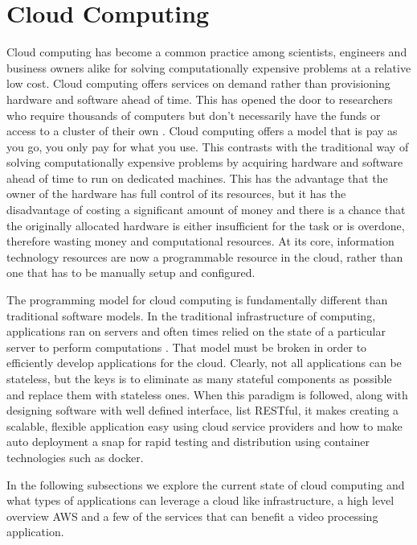 \section{\label{section:cloud_computing}Cloud Computing}
Cloud computing has become a common practice among scientists, engineers and
business owners alike for solving computationally expensive problems at a
relative low cost. Cloud computing offers services on demand rather than
provisioning hardware and software ahead of time. This has opened the door to
researchers who require thousands of computers but don't necessarily have the
funds or access to a cluster of their own \cite{armbrust2009above}. Cloud
computing offers a model that is pay as you go, you only pay for what you use.
This contrasts with the traditional way of solving computationally expensive
problems by acquiring hardware and software ahead of time to run on dedicated
machines. This has the advantage that the owner of the hardware has full control
of its resources, but it has the disadvantage of costing a significant amount of
money and there is a chance that the originally allocated hardware is  either
insufficient for the task or is overdone,  therefore wasting money and
computational resources.  At its core, information technology resources are now
a programmable resource in the cloud, rather than one that has to be manually
setup and configured.

The programming model for cloud computing is fundamentally different than
traditional software models. In the traditional infrastructure of computing,
applications ran on servers and often times relied on the state of a particular
server to perform computations \cite{awsbestpractices}. That model must be
broken in order to efficiently develop applications for the cloud. Clearly, not
all applications can be stateless, but the keys is to eliminate as many stateful
components as possible and replace them with stateless ones. When this paradigm
is followed, along with designing software with well defined interface, list
RESTful, it makes creating a scalable, flexible application easy using cloud
service providers \cite{awsbestpractices} and how to make auto deployment a snap
for rapid testing and distribution using container technologies such as docker.

In the following subsections we explore the current state of cloud computing and
what types of applications can leverage a cloud like infrastructure, a high
level overview AWS and a few of the services that can benefit a video processing
application.

